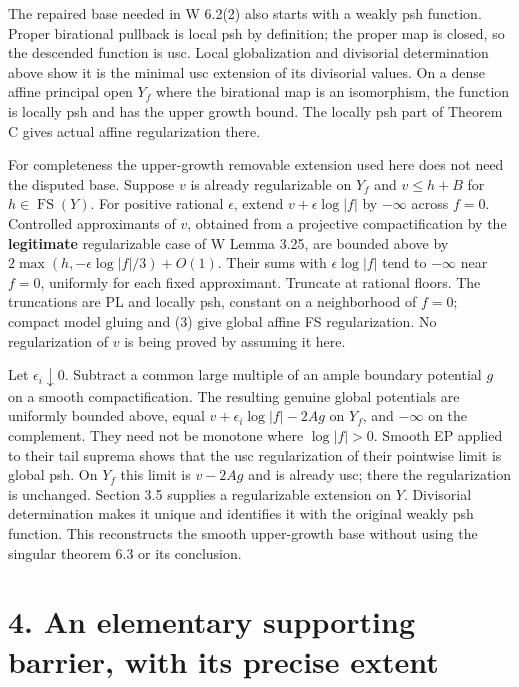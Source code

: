 \documentclass[
  11pt,
]{article}
\begin{document}
The repaired base needed in W 6.2(2) also starts with a weakly psh
function. Proper birational pullback is local psh by definition; the
proper map is closed, so the descended function is usc. Local
globalization and divisorial determination above show it is the minimal
usc extension of its divisorial values. On a dense affine principal open
\(Y_f\) where the birational map is an isomorphism, the function is
locally psh and has the upper growth bound. The locally psh part of
Theorem C gives actual affine regularization there.

For completeness the upper-growth removable extension used here does not
need the disputed base. Suppose \(v\) is already regularizable on
\(Y_f\) and \(v\leq h+B\) for \(h\in\operatorname{FS}(Y)\). For positive
rational \(\epsilon\), extend \(v+\epsilon\log|f|\) by \(-\infty\)
across \(f=0\). Controlled approximants of \(v\), obtained from a
projective compactification by the \textbf{legitimate} regularizable
case of W Lemma 3.25, are bounded above by
\(2\max(h,-\epsilon\log|f|/3)+O(1)\). Their sums with
\(\epsilon\log|f|\) tend to \(-\infty\) near \(f=0\), uniformly for each
fixed approximant. Truncate at rational floors. The truncations are PL
and locally psh, constant on a neighborhood of \(f=0\); compact model
gluing and (3) give global affine FS regularization. No regularization
of \(v\) is being proved by assuming it here.

Let \(\epsilon_i\downarrow0\). Subtract a common large multiple of an
ample boundary potential \(g\) on a smooth compactification. The
resulting genuine global potentials are uniformly bounded above, equal
\(v+\epsilon_i\log|f|-2Ag\) on \(Y_f\), and \(-\infty\) on the
complement. They need not be monotone where \(\log|f|>0\). Smooth EP
applied to their tail suprema shows that the usc regularization of their
pointwise limit is global psh. On \(Y_f\) this limit is \(v-2Ag\) and is
already usc; there the regularization is unchanged. Section 3.5 supplies
a regularizable extension on \(Y\). Divisorial determination makes it
unique and identifies it with the original weakly psh function. This
reconstructs the smooth upper-growth base without using the singular
theorem 6.3 or its conclusion.

\section{4. An elementary supporting barrier, with its precise
extent}\label{an-elementary-supporting-barrier-with-its-precise-extent}
\end{document}
